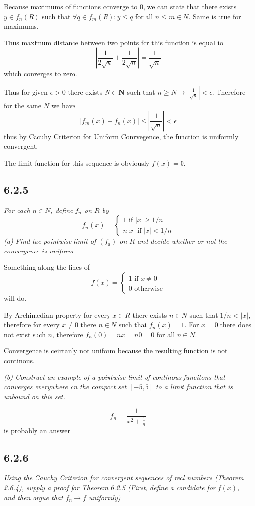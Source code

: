 \documentclass[11pt,oneside,titlepage]{book}
\begin{document}
Because maximums of functions converge to 0, we can state that
there exists $y \in f_n(R)$
such that $\forall q \in f_m(R): y \leq q$ for all $n \leq m \in N$.
Same is true for maximums. 

Thus maximum distance between two points for this function is equal to
$$| \frac{1}{2\sqrt{n}} + \frac{1}{2\sqrt{n}}| = \frac{1}{\sqrt{n}}$$
which converges to zero.

Thus for given $\epsilon > 0$ there exists $N \in \textbf{N}$ such that
$n \geq N \to |\frac{1}{\sqrt{n}}| < \epsilon$. Therefore for the same
$N$ we have
$$|f_m(x) - f_n(x)| \leq |\frac{1}{\sqrt{n}}| < \epsilon$$
thus by Cacuhy Criterion for Uniform Conrvegence, the function  is
uniformly convergent.

The limit function for this sequence is obviously $f(x) = 0$.

\subsection*{6.2.5}
\textit{For each $n \in N$, define $f_n$ on $R$ by}
$$f_n(x) =
\begin{cases}
  1 \text{ if } |x| \geq 1/n \\
  n|x| \text{ if } |x| < 1/n
\end{cases}
$$
\textit{(a) Find the pointwise limit of $(f_n)$ on $R$ and
  decide whether or not the convergence is uniform. }

Something along the lines of 
$$f(x) =
\begin{cases}
  1 \text{ if } x \neq 0 \\
  0 \text{ otherwise}
\end{cases}
$$
will do.

By Archimedian property for every $x \in R$ there exists $n \in N$ such that
$1/n < |x|$, therefore for every $x \neq 0$ there $n \in N$ such that
$f_n(x) = 1$. For $x = 0$ there does not exist such $n$, therefore $f_n(0) =
nx = n0 = 0$ for all $n \in N$.

Convergence is ceirtanly not uniform because the resulting function is not
continous.

\textit{(b) Construct an example of a pointwise limit of continous funcitons
  that converges everywhere on the compact set $[-5, 5]$ to a limit function
  that is unbound on this set.}

$$f_n = \frac{1}{x^2 + \frac{1}{n}}$$
is probably an answer

\subsection*{6.2.6}
\textit{Using the Cauchy Criterion for convergent sequences of real numbers
  (Theorem 2.6.4), supply a proof for Theorem 6.2.5 (First, define a candidate
  for $f(x)$, and then argue that $f_n \to f$ uniformly)}
\end{document}
